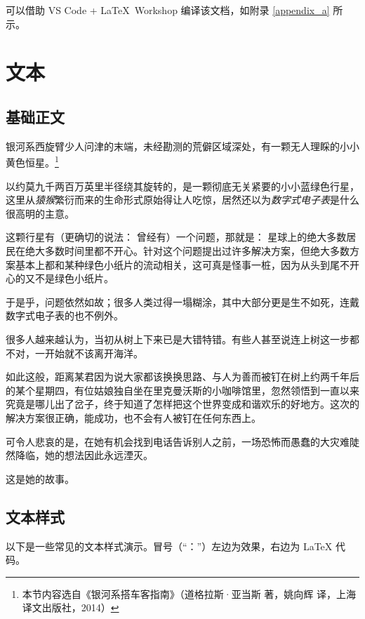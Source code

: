 \documentclass[12]{ctexart}
\begin{document}
可以借助 VS Code + \LaTeX\ Workshop 编译该文档，如附录 \ref{appendix_a} 所示。

\section{文本}\label{sec_text}

\subsection{基础正文}

银河系西旋臂少人问津的末端，未经勘测的荒僻区域深处，有一颗无人理睬的小小黄色恒星。\footnote{本节内容选自《银河系搭车客指南》（道格拉斯·亚当斯 著，姚向辉 译，上海译文出版社，2014）}

以约莫九千两百万英里半径绕其旋转的，是一颗彻底无关紧要的小小蓝绿色行星，这里从\emph{猿猴}繁衍而来的生命形式原始得让人吃惊，居然还以为\emph{数字式电子表}是什么很高明的主意。

这颗行星有（更确切的说法： 曾经有）一个问题，那就是： 星球上的绝大多数居民在绝大多数时间里都不开心。针对这个问题提出过许多解决方案，但绝大多数方案基本上都和某种绿色小纸片的流动相关，这可真是怪事一桩，因为从头到尾不开心的又不是绿色小纸片。

于是乎，问题依然如故；很多人类过得一塌糊涂，其中大部分更是生不如死，连戴数字式电子表的也不例外。

很多人越来越认为，当初从树上下来已是大错特错。有些人甚至说连上树这一步都不对，一开始就不该离开海洋。

如此这般，距离某君因为说大家都该换换思路、与人为善而被钉在树上约两千年后的某个星期四，有位姑娘独自坐在里克曼沃斯的小咖啡馆里，忽然领悟到一直以来究竟是哪儿出了岔子，终于知道了怎样把这个世界变成和谐欢乐的好地方。这次的解决方案很正确，能成功，也不会有人被钉在任何东西上。

可令人悲哀的是，在她有机会找到电话告诉别人之前，一场恐怖而愚蠢的大灾难陡然降临，她的想法因此永远湮灭。

这是她的故事。

\subsection{文本样式}\label{sec_text_style}

以下是一些常见的文本样式演示。冒号（“：”）左边为效果，右边为 LaTeX 代码。
\end{document}
